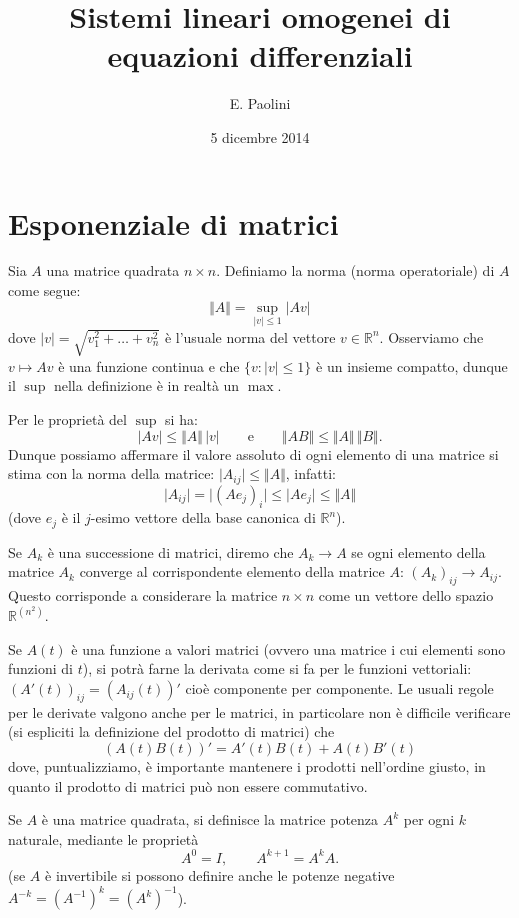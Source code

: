 \documentclass[italian,a4paper]{scrartcl}
\title{Sistemi lineari omogenei di equazioni differenziali}
\author{E. Paolini}
\date{5 dicembre 2014}
\newcommand{\RR}{{\mathbb R}}
\begin{document}
\maketitle

\section*{Esponenziale di matrici}
Sia $A$ una matrice quadrata $n\times n$. Definiamo la norma (norma
operatoriale) di $A$ come segue:
\[
  \Vert A \Vert = \sup_{\lvert v\rvert \le 1} \lvert Av\rvert
\]
dove $\lvert v\rvert = \sqrt{v_1^2+ \dots + v_n^2}$ è l'usuale norma del
vettore $v\in \RR^n$. Osserviamo che $v\mapsto Av$ è una funzione
continua e che $\{v\colon \lvert v\rvert \le 1\}$ è un insieme
compatto, dunque il $\sup$ nella definizione è in realtà un $\max$.

Per le proprietà del $\sup$ si ha:
\[
  |Av| \le \Vert A \Vert\, \lvert v \rvert
\qquad\text{e}\qquad
  \Vert A B \Vert \le \Vert A \Vert \, \Vert B \Vert.
\]
Dunque possiamo affermare il valore assoluto di ogni elemento di una
matrice si stima con la norma della matrice: $\lvert A_{ij}\rvert \le
\Vert A \Vert$, infatti:
\[
  \lvert A_{ij} \rvert = \lvert (A e_j)_i\lvert \le \lvert A e_j\rvert
  \le \Vert A \Vert
\]
(dove $e_j$ è il $j$-esimo vettore della base canonica di $\RR^n$).

Se $A_k$ è una successione di matrici, diremo che $A_k\to A$ se ogni
elemento della matrice $A_k$ converge al corrispondente elemento della
matrice $A$: $(A_k)_{ij} \to A_{ij}$. Questo corrisponde a considerare
la matrice $n\times n$ come un vettore dello spazio $\RR^{(n^2)}$.

Se $A(t)$ è una funzione a valori matrici (ovvero una matrice i cui
elementi sono funzioni di $t$), si potrà farne la derivata
come si fa per le funzioni vettoriali: $(A'(t))_{ij} = (A_{ij}(t))'$
cioè componente per componente. Le usuali regole per le derivate
valgono anche per le matrici, in particolare non è difficile
verificare (si espliciti la definizione del prodotto di matrici) che
\[
 (A(t)B(t))' = A'(t) B(t) + A(t) B'(t)
\]
dove, puntualizziamo, è importante mantenere i prodotti nell'ordine
giusto, in quanto il prodotto di matrici può non essere commutativo.

Se $A$ è una matrice quadrata, si definisce la matrice potenza $A^k$
per ogni $k$ naturale, mediante le proprietà
\[
  A^0 = I, \qquad A^{k+1} = A^kA.
\]
(se $A$ è invertibile si possono definire anche le potenze negative
$A^{-k}=(A^{-1})^k = (A^k)^{-1}$).
\end{document}

